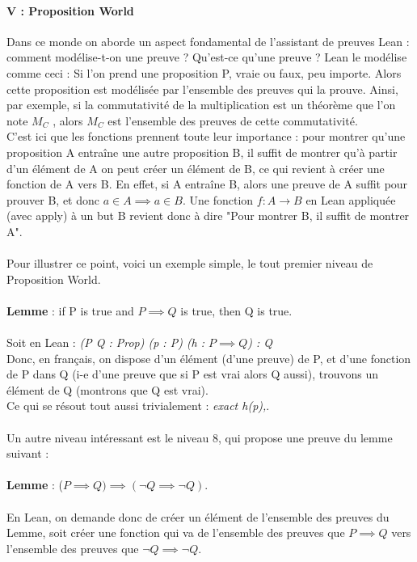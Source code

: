 \documentclass[french,frenchkw]{article}
\begin{document}
\paragraph{V : Proposition World} 
Dans ce monde on aborde un aspect fondamental de l'assistant de preuves Lean : comment modélise-t-on une preuve ? Qu'est-ce qu'une preuve ? Lean le modélise comme ceci : Si l'on prend une proposition P, vraie ou faux, peu importe. Alors cette proposition est modélisée par l'ensemble des preuves qui la prouve. Ainsi, par exemple, si la commutativité de la multiplication est un théorème que l'on note $M_C$ , alors $M_C$ est l'ensemble des preuves de cette commutativité.\\
C'est ici que les fonctions prennent toute leur importance : pour montrer qu'une proposition A entraîne une autre proposition B, il suffit de montrer qu'à partir d'un élément de A on peut créer un élément de B, ce qui revient à créer une fonction de A vers B. En effet, si A entraîne B, alors une preuve de A suffit pour prouver B, et donc $a \in A \implies a \in B$. Une fonction $f : A \xrightarrow{} B$ en Lean appliquée (avec apply) à un but B revient donc à dire "Pour montrer B, il suffit de montrer A".\\
\\
Pour illustrer ce point, voici un exemple simple, le tout premier niveau de Proposition World. \\ \\
\textbf{Lemme} : if P is true and $P \implies Q$ is true, then Q is true. \\ \\
Soit en Lean : \textit{(P Q : Prop) (p : P) (h : $P \implies Q$) : Q} \\
Donc, en français, on dispose d'un élément (d'une preuve) de P, et d'une fonction de P dans Q (i-e d'une preuve que si P est vrai alors Q aussi), trouvons un élément de Q (montrons que Q est vrai). \\
Ce qui se résout tout aussi trivialement : \textit{exact h(p),}.\\
\\
Un autre niveau intéressant est le niveau 8, qui propose une preuve du lemme suivant : \\
\\
\textbf{Lemme} : ($P \implies Q) \implies (\lnot Q \implies \lnot Q)$. \\
\\
En Lean, on demande donc de créer un élément de l'ensemble des preuves du Lemme, soit créer une fonction qui va de l'ensemble des preuves que $P \implies Q$ vers l'ensemble des preuves que $\lnot Q \implies \lnot Q$.
\end{document}
